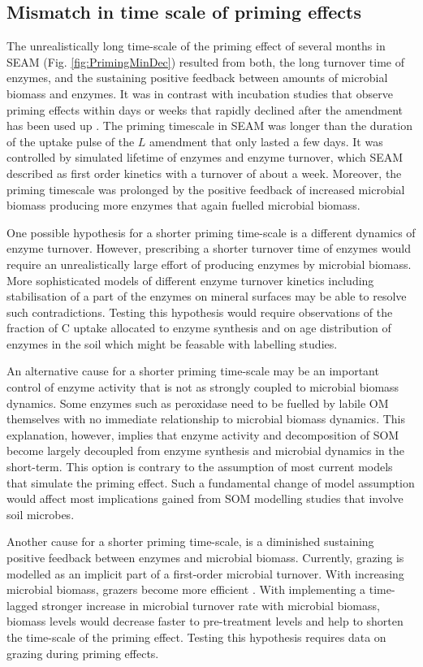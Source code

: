 \subsection{Mismatch in time scale of priming effects}
The unrealistically long time-scale of the priming effect of several months in
SEAM (Fig. \ref{fig:PrimingMinDec}) resulted from both, the long turnover time of
enzymes, and the sustaining positive feedback between amounts of microbial
biomass and enzymes. It was in contrast with incubation studies that observe
priming effects within days or weeks that rapidly declined after the amendment
has been used up \citep{Blagodatskaya14}.
The priming timescale in SEAM was longer than the duration of the uptake pulse
of the $L$ amendment that only lasted a few days. It was controlled by simulated
lifetime of enzymes and enzyme turnover, which SEAM described as first order
kinetics with a turnover of about a week. Moreover, the priming timescale was
prolonged by the positive feedback of increased microbial biomass producing more
enzymes that again fuelled microbial biomass. 

One possible hypothesis for a shorter priming time-scale is a different dynamics
of enzyme turnover. However, prescribing a shorter turnover time of enzymes would
require an unrealistically large effort of producing enzymes by microbial
biomass. More sophisticated models of different enzyme turnover kinetics
including stabilisation of a part of the enzymes on mineral surfaces
\citep{Burns13} may be able to resolve such contradictions. Testing this
hypothesis would require observations of the fraction of C uptake allocated to
enzyme synthesis and on age distribution of enzymes in the soil which might be
feasable with labelling studies.

An alternative cause for a shorter priming time-scale may be an important
control of enzyme activity that is not as strongly coupled to microbial biomass
dynamics. Some enzymes such as peroxidase need to be fuelled by labile OM
themselves \citep{Rousk14} with no immediate relationship to microbial biomass
dynamics. This explanation, however, implies that enzyme activity and
decomposition of SOM become largely decoupled from enzyme synthesis and
microbial dynamics in the short-term. This option is contrary to the assumption
of most current models that simulate the priming effect. Such a fundamental
change of model assumption would affect most implications gained from
SOM modelling studies that involve soil microbes.

Another cause for a shorter priming time-scale, is a diminished sustaining
positive feedback between enzymes and microbial biomass. Currently, grazing is
modelled as an implicit part of a first-order microbial turnover. With
increasing microbial biomass, grazers become more efficient \citep{Clarholm81}.
With implementing a time-lagged stronger increase in microbial turnover rate
with microbial biomass, biomass levels would decrease faster to pre-treatment
levels and help to shorten the time-scale of the priming effect. Testing this
hypothesis requires data on grazing during priming effects.

